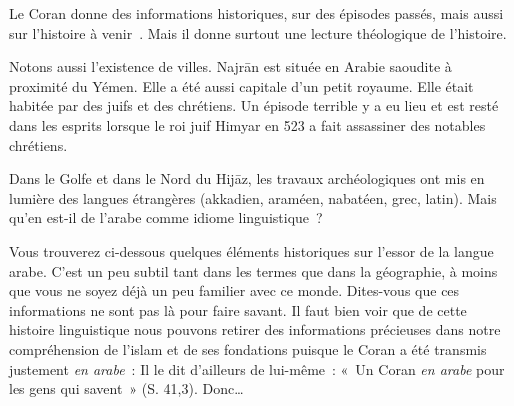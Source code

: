 \begin{Synthesis}
Le Coran donne des informations
historiques, sur des épisodes passés, mais aussi sur l'histoire à
venir~. Mais il donne
surtout une lecture théologique de l'histoire.
\end{Synthesis}

Notons aussi l'existence de villes. Najrān est située en Arabie saoudite
à proximité du Yémen. Elle a été aussi capitale d'un petit royaume. Elle
était habitée par des juifs et des chrétiens. Un épisode terrible y a eu
lieu et est resté dans les esprits lorsque le roi juif Himyar en 523 a
fait assassiner des notables chrétiens.



Dans le Golfe et dans le Nord du Hijāz, les travaux archéologiques ont
mis en lumière des langues étrangères (akkadien, araméen, nabatéen,
grec, latin). Mais qu'en est-il de l'arabe comme idiome linguistique~?


Vous trouverez ci-dessous quelques éléments historiques sur l'essor de
la langue arabe. C'est un peu subtil tant dans les termes que dans la
géographie, à moins que vous ne soyez déjà un peu familier avec ce
monde. Dites-vous que ces informations ne sont pas là pour faire savant.
Il faut bien voir que de cette histoire linguistique nous pouvons
retirer des informations précieuses dans notre compréhension de l'islam
et de ses fondations puisque le Coran a été transmis justement \emph{en
arabe}~: Il le dit d'ailleurs de lui-même~: «~Un Coran \emph{en arabe}
pour les gens qui savent~» (S. 41,3). Donc\ldots{}

